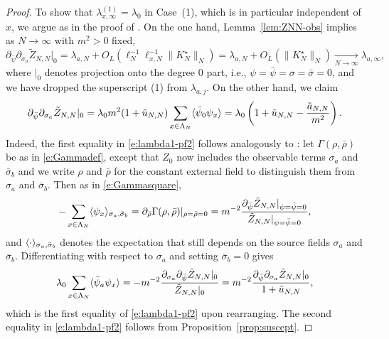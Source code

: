 \documentclass[11pt]{amsart}
\numberwithin{equation}{section}
\numberwithin{theorem}{section}
\newcommand{\1}{{\bf 1}}
\newcommand{\obs}{\star}
\newcommand{\Kobs}{K^\obs}
\newcommand{\ellxN}{\ell_{x,N}}
\newcommand{\OL}{O_L}
\begin{document}
\begin{proof}
  To show that  $\lambda_{x,\infty}^{(1)}=\lambda_0$ in Case~(1),
  which is in particular independent of $x$, 
  we argue as in the proof of \cite[Lemma~4.6]{MR3345374}.
  On the one hand, Lemma~\ref{lem:ZNN-obs} implies as $N\to\infty$ with $m^2>0$ fixed,
  \begin{equation}
    \label{e:lambda1-pf1}
    \partial_{\bar\psi} \partial_{\sigma_a} \tilde Z_{N,N}|_{0}
    = \lambda_{a,N} + \OL(\ell_N^{-1}\ellxN^{-1} \|\Kobs_N\|_N)
    = \lambda_{a,N} + \OL(\|\Kobs_N\|_N)
    \xrightarrow[N\to\infty]{}
    \lambda_{a,\infty},
  \end{equation}
  where $|_0$ denotes projection onto the degree $0$ part, i.e., 
  $\psi=\bar\psi=\sigma=\bar\sigma=0$, and we have dropped the superscript (1) from $\lambda_{a,j}$.
  On the other hand, we claim
  \begin{equation}
    \label{e:lambda1-pf2}
      \partial_{\bar\psi} \partial_{\sigma_a} \tilde Z_{N,N}|_{0}
      = \lambda_{0}m^2(1+\tilde u_{N,N})\sum_{x\in\Lambda_N}\langle \bar\psi_0\psi_x \rangle
      = \lambda_{0}\left({1+\tilde u_{N,N}-\frac{\tilde a_{N,N}}{m^2}}\right).
  \end{equation}
  Indeed, the first equality in \eqref{e:lambda1-pf2} follows analogously to \cite[(4.51)--(4.53)]{MR3345374}:
  let $\Gamma(\rho,\bar\rho)$ be as in \eqref{e:Gammadef}, except that $Z_0$
  now includes the observable terms $\sigma_a$ and $\bar\sigma_b$
  and we write $\rho$ and $\bar\rho$ for the constant
  external field to distinguish them from $\sigma_a$ and $\bar\sigma_b$. Then
  as in \eqref{e:Gammasquare},
  \begin{equation}
    -\sum_{x\in\Lambda_N} \langle \psi_x \rangle_{\sigma_a,\bar\sigma_b} =
    \partial_{\bar\rho} \Gamma(\rho,\bar\rho)|_{\rho=\bar\rho=0} = m^{-2} \frac{\partial_{\bar\psi}\tilde Z_{N,N}|_{\psi=\bar\psi=0}}{\tilde Z_{N,N}|_{\psi=\bar\psi=0}},
  \end{equation}
  and $\langle \cdot \rangle_{\sigma_a,\bar\sigma_b}$ denotes the expectation that still depends on
  the source
  fields $\sigma_a$ and $\bar\sigma_b$.
  Differentiating with respect to $\sigma_a$ and setting $\bar\sigma_b=0$ gives
  \begin{equation}
    \lambda_{0}
    \sum_{x\in\Lambda_N} \langle \bar\psi_a\psi_x \rangle
    = -m^{-2} \frac{\partial_{\sigma_a}\partial_{\bar\psi}\tilde Z_{N,N}|_{0}}{\tilde Z_{N,N}|_0}
    = m^{-2} \frac{\partial_{\bar\psi}\partial_{\sigma_a}\tilde Z_{N,N}|_{0}}{1+\tilde u_{N,N}},
  \end{equation}
  which is the first equality of \eqref{e:lambda1-pf2} upon
  rearranging.  The second equality in \eqref{e:lambda1-pf2} follows
  from Proposition~\ref{prop:suscept}.


\end{proof}
\end{document}
